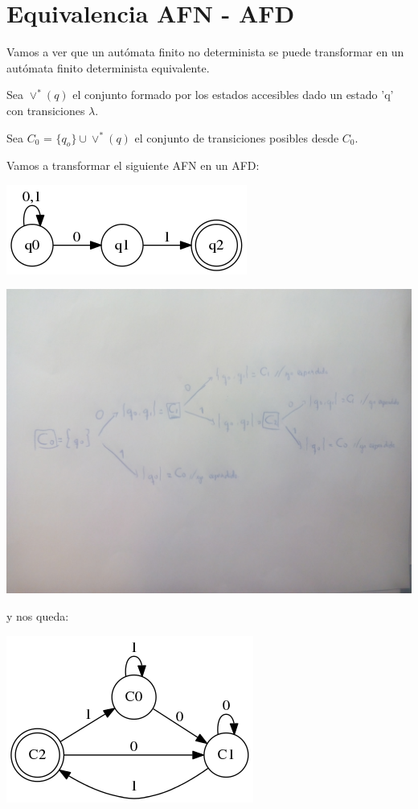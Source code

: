 \documentclass{apuntes}
\begin{document}
\begin{example}
\end{example}

\section{Equivalencia AFN - AFD}

Vamos a ver que un autómata finito no determinista se puede transformar en un autómata finito determinista equivalente.

Sea $\vee^*(q)$ el conjunto formado por los estados accesibles dado un estado 'q' con transiciones $\lambda$.

Sea $C_0$ = $\{q_o\} \cup \vee^*(q)$ el conjunto de transiciones posibles desde $C_0$.

Vamos a transformar el siguiente AFN en un AFD:
\begin{example}
\begin{center}
\includegraphics[scale=0.4]{automataFinal5.png}
\end{center}

\begin{center}
\includegraphics[scale=0.1]{img/arbolBusqueda.jpg}
\end{center}

y nos queda:
\begin{center}
\includegraphics[scale=0.4]{automataFinal6.png}
\end{center}
\end{example}
\end{document}
